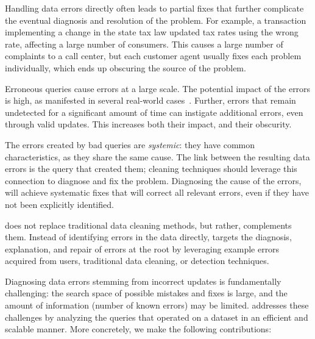 \begin{description}[leftmargin=*, topsep=0mm, itemsep=0mm]
    
    \item[Obscurity.] 
    Handling data errors directly often
    leads to partial fixes that further complicate the eventual diagnosis and
    resolution of the problem. For example, a transaction implementing a
    change in the state tax law updated tax rates using the wrong rate,
    affecting a large number of consumers. This causes a large number of
    complaints to a call center, but each customer agent usually fixes each
    problem individually, which ends up obscuring the source of the problem.
    
    \item[Large impact.] Erroneous queries cause errors at a large scale. The
    potential impact of the errors is high, as manifested in several
    real-world cases~\cite{Yates10, Grady13, sakalerrors}. Further, errors
    that remain undetected for a significant amount of time can instigate
    additional errors, even through valid updates. This increases both their
    impact, and their obscurity.
    
    \item[Systemic errors.] The errors created by bad queries are
    \emph{systemic}: they have common characteristics, as they share the same
    cause. The link between the resulting data errors is the query that
    created them; cleaning techniques should leverage this connection to
    diagnose and fix the problem. Diagnosing the cause of the errors, will
    achieve systematic fixes that will correct all relevant errors, even if
    they have not been explicitly identified.
    
\end{description}
% 
\sys does not replace traditional data cleaning methods, but rather, complements them.
Instead of identifying errors in the data directly, 
\sys targets the diagnosis, explanation, and repair of errors at the root by
leveraging example errors acquired from 
users, traditional data cleaning, or detection techniques.

Diagnosing data errors stemming from incorrect updates is fundamentally
challenging: the search space of possible mistakes and fixes is large, and the
amount of information (number of known errors) may be limited. 
\sys addresses these challenges by analyzing the queries that operated on a
dataset in an efficient and scalable manner. More concretely, we make the
following contributions:



